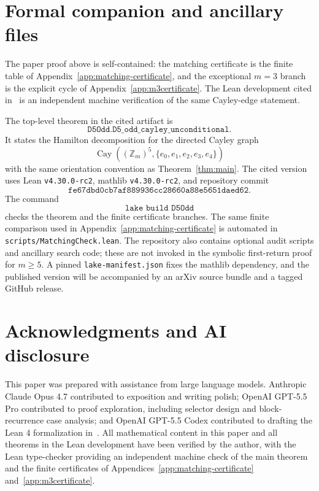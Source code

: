\documentclass[11pt]{article}
\theoremstyle{definition}
\newcommand{\Cay}{\operatorname{Cay}}
\begin{document}
\section{Formal companion and ancillary files}\label{app:formal}

The paper proof above is self-contained: the matching certificate is the finite table of
Appendix~\ref{app:matching-certificate}, and the exceptional \(m=3\) branch is the explicit cycle of
Appendix~\ref{app:m3certificate}.  The Lean development cited in~\cite{D5OddLean} is an independent
machine verification of the same Cayley-edge statement.

The top-level theorem in the cited artifact is
\[
\texttt{D5Odd.D5\_odd\_cayley\_unconditional}.
\]
It states the Hamilton decomposition for the directed Cayley graph
\[
\Cay((\mathbb Z_m)^5,\{e_0,e_1,e_2,e_3,e_4\})
\]
with the same orientation convention as Theorem~\ref{thm:main}.  The cited version uses Lean
\texttt{v4.30.0-rc2}, mathlib
\texttt{v4.30.0-rc2}, and repository commit
\[
\texttt{fe67dbd0cb7af889936cc28660a88e5651daed62}.
\]
The command
\[
\texttt{lake build D5Odd}
\]
checks the theorem and the finite certificate branches.  The same finite comparison used in
Appendix~\ref{app:matching-certificate} is automated in \texttt{scripts/MatchingCheck.lean}.  The
repository also contains optional audit scripts and ancillary search code; these are not invoked in
the symbolic first-return proof for \(m\ge5\).  A pinned \texttt{lake-manifest.json} fixes the mathlib
dependency, and the published version will be accompanied by an arXiv source bundle and a tagged
GitHub release.



\section*{Acknowledgments and AI disclosure}

This paper was prepared with assistance from large language models.  Anthropic Claude Opus 4.7
contributed to exposition and writing polish; OpenAI GPT-5.5 Pro contributed to proof exploration,
including selector design and block-recurrence case analysis; and OpenAI GPT-5.5 Codex contributed
to drafting the Lean 4 formalization in~\cite{D5OddLean}.  All mathematical content in this paper
and all theorems in the Lean development have been verified by the author, with the Lean type-checker
providing an independent machine check of the main theorem and the finite certificates of
Appendices~\ref{app:matching-certificate} and~\ref{app:m3certificate}.
\end{document}
